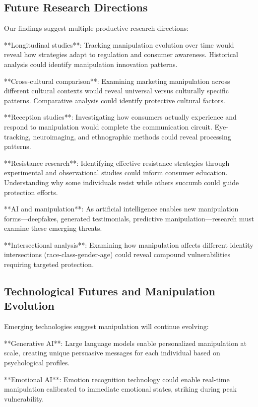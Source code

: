 \subsection{Future Research Directions}

Our findings suggest multiple productive research directions:

**Longitudinal studies**: Tracking manipulation evolution over time would reveal how strategies adapt to regulation and consumer awareness. Historical analysis could identify manipulation innovation patterns.

**Cross-cultural comparison**: Examining marketing manipulation across different cultural contexts would reveal universal versus culturally specific patterns. Comparative analysis could identify protective cultural factors.

**Reception studies**: Investigating how consumers actually experience and respond to manipulation would complete the communication circuit. Eye-tracking, neuroimaging, and ethnographic methods could reveal processing patterns.

**Resistance research**: Identifying effective resistance strategies through experimental and observational studies could inform consumer education. Understanding why some individuals resist while others succumb could guide protection efforts.

**AI and manipulation**: As artificial intelligence enables new manipulation forms—deepfakes, generated testimonials, predictive manipulation—research must examine these emerging threats.

**Intersectional analysis**: Examining how manipulation affects different identity intersections (race-class-gender-age) could reveal compound vulnerabilities requiring targeted protection.

\subsection{Technological Futures and Manipulation Evolution}

Emerging technologies suggest manipulation will continue evolving:

**Generative AI**: Large language models enable personalized manipulation at scale, creating unique persuasive messages for each individual based on psychological profiles.

**Emotional AI**: Emotion recognition technology could enable real-time manipulation calibrated to immediate emotional states, striking during peak vulnerability.

